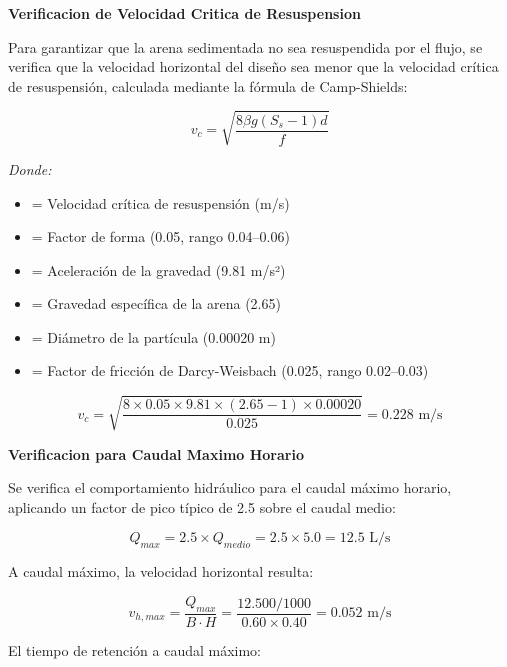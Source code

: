 \documentclass[12pt,a4paper]{article}
\newcommand{\captionequation}[1]{}  %
\begin{document}
\textbf{Verificacion de Velocidad Critica de Resuspension}

Para garantizar que la arena sedimentada no sea resuspendida por el flujo, se verifica que la velocidad horizontal del dise\~no sea menor que la velocidad cr\'itica de resuspensi\'on, calculada mediante la f\'ormula de Camp-Shields:

\begin{equation}
v_c = \sqrt{\frac{8 \beta g (S_s - 1) d}{f}}
\end{equation}
\captionequation{Velocidad critica de resuspension - Camp-Shields}

\textit{Donde:}
\begin{itemize}[noitemsep,leftmargin=2em]
    \item[$v_c$] = Velocidad cr\'itica de resuspensi\'on (m/s)
    \item[$\beta$] = Factor de forma (0.05, rango 0.04--0.06)
    \item[$g$] = Aceleraci\'on de la gravedad (9.81 m/s²)
    \item[$S_s$] = Gravedad espec\'ifica de la arena (2.65)
    \item[$d$] = Di\'ametro de la part\'icula (0.00020 m)
    \item[$f$] = Factor de fricci\'on de Darcy-Weisbach (0.025, rango 0.02--0.03)
\end{itemize}

\begin{equation}
v_c = \sqrt{\frac{8 \times 0.05 \times 9.81 \times (2.65 - 1) \times 0.00020}{0.025}} = 0.228 \text{ m/s}
\end{equation}
\captionequation{Velocidad critica calculada}

\textbf{Verificacion para Caudal Maximo Horario}

Se verifica el comportamiento hidr\'aulico para el caudal m\'aximo horario, aplicando un factor de pico t\'ipico de 2.5 sobre el caudal medio:

\begin{equation}
Q_{max} = 2.5 \times Q_{medio} = 2.5 \times 5.0 = 12.5 \text{ L/s}
\end{equation}

A caudal m\'aximo, la velocidad horizontal resulta:

\begin{equation}
v_{h,max} = \frac{Q_{max}}{B \cdot H} = \frac{12.500/1000}{0.60 \times 0.40} = 0.052 \text{ m/s}
\end{equation}

El tiempo de retenci\'on a caudal m\'aximo:
\end{document}
